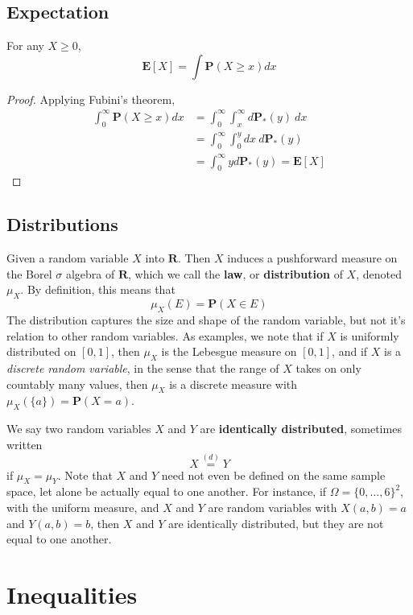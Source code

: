 \section{Expectation}

\begin{theorem}
    For any $X \geq 0$,
    \[ \mathbf{E}[X] = \int \mathbf{P}(X \geq x) dx \]
\end{theorem}
\begin{proof}
    Applying Fubini's theorem,
    \begin{align*}
        \int_0^\infty \mathbf{P}(X \geq x) dx &= \int_0^\infty \int_x^\infty d \mathbf{P}_*(y)\ dx\\
        &= \int_0^\infty \int_0^y dx\ d\mathbf{P}_*(y)\\
        &= \int_0^\infty y d\mathbf{P}_*(y) = \mathbf{E}[X]
    \end{align*}
\end{proof}

\section{Distributions}

Given a random variable $X$ into $\mathbf{R}$. Then $X$ induces a pushforward measure on the Borel $\sigma$ algebra of $\mathbf{R}$, which we call the {\bf law}, or {\bf distribution} of $X$, denoted $\mu_X$. By definition, this means that
%
\[ \mu_X(E) = \mathbf{P}(X \in E) \]
%
The distribution captures the size and shape of the random variable, but not it's relation to other random variables. As examples, we note that if $X$ is uniformly distributed on $[0,1]$, then $\mu_X$ is the Lebesgue measure on $[0,1]$, and if $X$ is a {\it discrete random variable}, in the sense that the range of $X$ takes on only countably many values, then $\mu_X$ is a discrete measure with $\mu_X(\{ a \}) = \mathbf{P}(X = a)$.

We say two random variables $X$ and $Y$ are {\bf identically distributed}, sometimes written
%
\[ X \overset{(d)}{=} Y \]
%
if $\mu_X = \mu_Y$. Note that $X$ and $Y$ need not even be defined on the same sample space, let alone be actually equal to one another. For instance, if $\Omega = \{ 0, \dots, 6 \}^2$, with the uniform measure, and $X$ and $Y$ are random variables with $X(a,b) = a$ and $Y(a,b) = b$, then $X$ and $Y$ are identically distributed, but they are not equal to one another.

\chapter{Inequalities}

